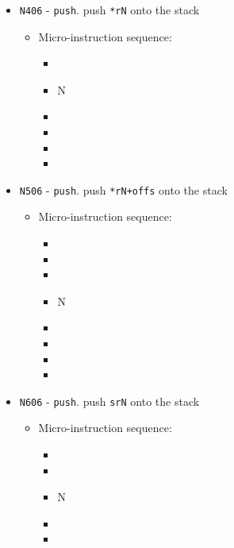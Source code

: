 \documentclass{article}
\begin{document}
\begin{itemize}
    \item \Verb|N406| - \Verb|push|. push \Verb|*rN| onto the stack
    \begin{itemize}
        \item Micro-instruction sequence:
        \begin{itemize}
            \item \decrementsp
            \item \regptodata N
            \item \holddata
            \item \sptoaddr
            \item \writeRAM
            \item \done
        \end{itemize}
    \end{itemize}

    
    \item \Verb|N506| - \Verb|push|. push \Verb|*rN+offs| onto the stack
    \begin{itemize}
        \item Micro-instruction sequence:
        \begin{itemize}
            \item \pkptroutinc
            \item \datatooffs
            \item \decrementsp
            \item \regptodatao N
            \item \holddata
            \item \sptoaddr
            \item \writeRAMo
            \item \done
        \end{itemize}
    \end{itemize}

    
    \item \Verb|N606| - \Verb|push|. push \Verb|srN| onto the stack
    \begin{itemize}
        \item Micro-instruction sequence:
        \begin{itemize}
            \item \decrementsp
            \item \sptoaddr
            \item \specialtodata N
            \item \writeRAM
            \item \done
        \end{itemize}
    \end{itemize}


\end{itemize}
\end{document}
